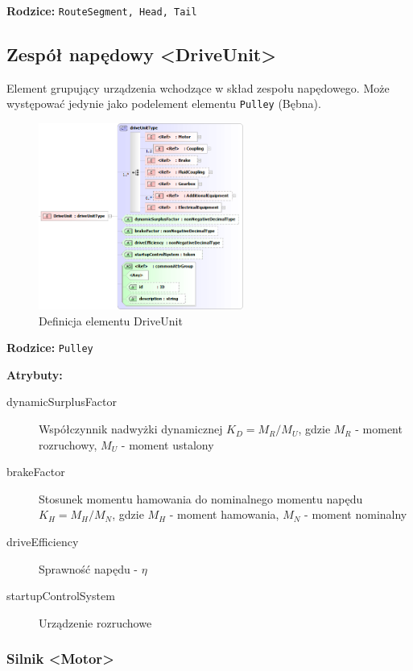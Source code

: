 \documentclass[12pt,a4paper]{article}
\begin{document}
\noindent\textbf{Rodzice:} \texttt{RouteSegment, Head, Tail}

\subsection{Zespół napędowy <DriveUnit>}
Element grupujący urządzenia wchodzące w skład zespołu napędowego. Może
występować jedynie jako podelement elementu {\tt Pulley} (Bębna).

\begin{figure}[H]
  \centering
  \includegraphics[width=0.6\textwidth]{png/liquid/DriveUnit}
  \caption{Definicja elementu DriveUnit}
  \label{fig:driveUnit-xsd}
\end{figure}

\noindent\textbf{Rodzice:} \texttt{Pulley}

\noindent\textbf{Atrybuty:}
\begin{description}
\item[dynamicSurplusFactor] Współczynnik nadwyżki dynamicznej $K_D = M_R/M_U$,
  gdzie $M_R$ - moment rozruchowy, $M_U$ - moment ustalony
\item[brakeFactor] Stosunek momentu hamowania do nominalnego momentu napędu $K_H
  = M_H/M_N$, gdzie $M_H$ - moment hamowania, $M_N$ - moment nominalny
\item[driveEfficiency] Sprawność napędu - $\eta$
\item[startupControlSystem] Urządzenie rozruchowe
\end{description}

\subsubsection{Silnik <Motor>}
\end{document}
